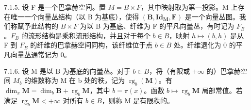 7.1.5. 设 F 是一个巴拿赫空间。置 \(M = B \times F\)，其中映射取为第一投影。M 上存在唯一一个向量丛结构（以 B 为基底），使得 \((\mathbf{B}, \mathbf{Id}_{\mathbf{M}}, \mathbf{F})\) 是一个向量丛图。我们称赋予此结构的 \(B \times F\) 为以 B 为基底、纤维为 F 的平凡向量丛，有时记为 \(F_{B}\)。\(F_{B}\) 的流形结构是乘积流形结构，并且对于每个 \(b \in B\)，映射 \(h \mapsto (b, h)\) 是从 F 到 \(F_{B}\) 的纤维的巴拿赫空间同构，该纤维位于点 \(b \in B\) 处。纤维退化为 0 的平凡向量丛通常记为 0。

7.1.6. 设 M 是以 B 为基底的向量丛。对于 \(b \in B\)，将（有限或 \(+\infty\) 的）巴拿赫空间 \(M_{b}\) 的维数称为 M 在 b 处的秩，记为 \(\operatorname{rg}_{b}(\mathbf{M})\)。有 \(\dim_{x}\mathbf{M} = \dim_{b}\mathbf{B} + \operatorname{rg}_{b}\mathbf{M}\)，其中 \(b = \pi(x)\)。函数 \(b \mapsto \operatorname{rg}_{b}\mathbf{M}\) 局部常值。若满足 \(\operatorname{rg}_{b}\mathbf{M} < +\infty\) 对所有 \(b \in B\)，则称 M 是有限秩的。

